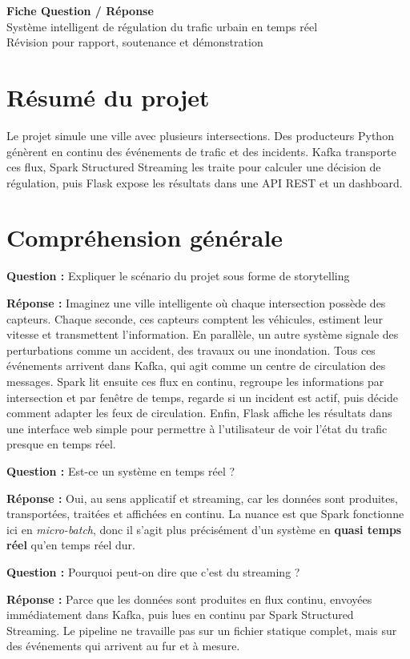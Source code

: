 \documentclass[11pt,a4paper]{article}
\newcommand{\question}[1]{
  \begin{questionbox}
  \textbf{Question :} #1
  \end{questionbox}
}
\newcommand{\reponse}{\textbf{Réponse : }}
\begin{document}
\begin{center}
  {\LARGE \textbf{Fiche Question / Réponse}}\\[0.3em]
  {\large Système intelligent de régulation du trafic urbain en temps réel}\\[0.4em]
  {\normalsize Révision pour rapport, soutenance et démonstration}
\end{center}

\section*{Résumé du projet}

Le projet simule une ville avec plusieurs intersections. Des producteurs Python génèrent en continu des événements de trafic et des incidents. Kafka transporte ces flux, Spark Structured Streaming les traite pour calculer une décision de régulation, puis Flask expose les résultats dans une API REST et un dashboard.

\section{Compréhension générale}

\question{Expliquer le scénario du projet sous forme de storytelling}
\reponse Imaginez une ville intelligente où chaque intersection possède des capteurs. Chaque seconde, ces capteurs comptent les véhicules, estiment leur vitesse et transmettent l'information. En parallèle, un autre système signale des perturbations comme un accident, des travaux ou une inondation. Tous ces événements arrivent dans Kafka, qui agit comme un centre de circulation des messages. Spark lit ensuite ces flux en continu, regroupe les informations par intersection et par fenêtre de temps, regarde si un incident est actif, puis décide comment adapter les feux de circulation. Enfin, Flask affiche les résultats dans une interface web simple pour permettre à l'utilisateur de voir l'état du trafic presque en temps réel.

\question{Est-ce un système en temps réel ?}
\reponse Oui, au sens applicatif et streaming, car les données sont produites, transportées, traitées et affichées en continu. La nuance est que Spark fonctionne ici en \textit{micro-batch}, donc il s'agit plus précisément d'un système en \textbf{quasi temps réel} qu'en temps réel dur.

\question{Pourquoi peut-on dire que c'est du streaming ?}
\reponse Parce que les données sont produites en flux continu, envoyées immédiatement dans Kafka, puis lues en continu par Spark Structured Streaming. Le pipeline ne travaille pas sur un fichier statique complet, mais sur des événements qui arrivent au fur et à mesure.
\end{document}
